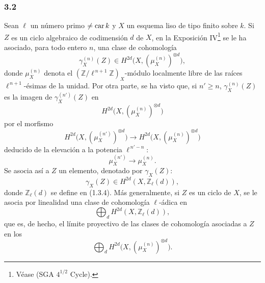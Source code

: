 \subsubsection*{3.2}
Sean \(\ell\) un número primo \(\ne\operatorname{car} k\) y \(X\) un esquema liso de tipo finito sobre \(k\). Si \(Z\) es un ciclo algebraico de codimensión \(d\) de \(X\), en la Exposición IV\footnote{Véase (SGA \(4^{1/2}\) Cycle).} se le ha asociado, para todo entero \(n\), una clase de cohomología
\[
\gamma_X^{(n)}(Z)\in H^{2d}\bigl(X,(\mu_X^{(n)})^{\otimes d}\bigr),
\]
donde \(\mu_X^{(n)}\) denota el \((\mathbb Z/\ell^{\,n+1}\mathbb Z)_X\)-módulo localmente libre de las raíces \(\ell^{\,n+1}\)-ésimas de la unidad. Por otra parte, se ha visto que, si \(n'\ge n\), \(\gamma_X^{(n)}(Z)\) es la imagen de \(\gamma_X^{(n')}(Z)\) en
\[
H^{2d}\bigl(X,(\mu_X^{(n)})^{\otimes d}\bigr)
\]
por el morfismo
\[
H^{2d}\bigl(X,(\mu_X^{(n')})^{\otimes d}\bigr)
\longrightarrow
H^{2d}\bigl(X,(\mu_X^{(n)})^{\otimes d}\bigr)
\]
deducido de la elevación a la potencia \(\ell^{\,n'-n}\):
\[
\mu_X^{(n')}\longrightarrow \mu_X^{(n)}.
\]
Se asocia así a \(Z\) un elemento, denotado por \(\gamma_X(Z)\):
\[
\gamma_X(Z)\in H^{2d}(X,\mathbb Z_\ell(d)),
\]
donde \(\mathbb Z_\ell(d)\) se define en (1.3.4). Más generalmente, si \(Z\) es un ciclo de \(X\), se le asocia por linealidad una clase de cohomología \(\ell\)-ádica en
\[
\bigoplus_d H^{2d}(X,\mathbb Z_\ell(d)),
\]
que es, de hecho, el límite proyectivo de las clases de cohomología asociadas a \(Z\) en los
\[
\bigoplus_d H^{2d}\bigl(X,(\mu_X^{(n)})^{\otimes d}\bigr).
\]
